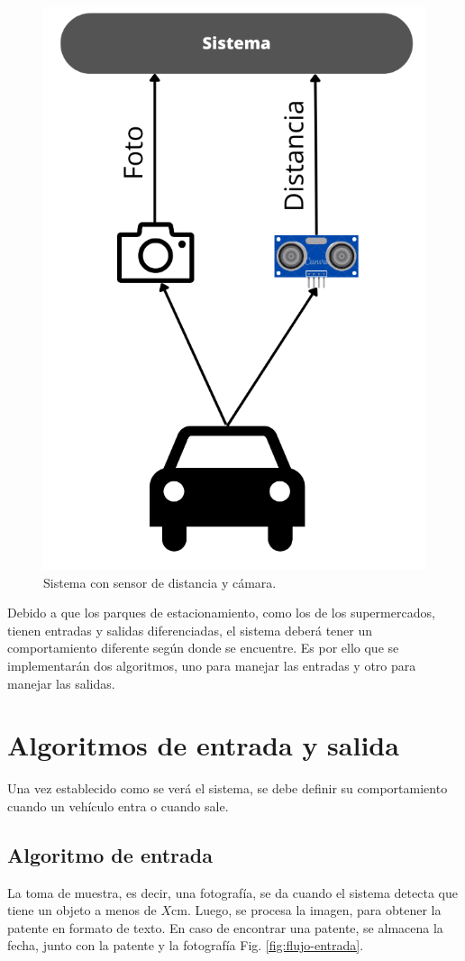 \begin{figure}
    \centering
    \includegraphics[width=.3\textwidth]{imgs/sistema-con-sensor.png}
    \caption{Sistema con sensor de distancia y cámara.}
    \label{fig:sistema-completa}
\end{figure}

Debido a que los parques de estacionamiento, como los de los supermercados, tienen entradas y salidas diferenciadas, el sistema deberá tener un comportamiento diferente según donde se encuentre.
Es por ello que se implementarán dos algoritmos, uno para manejar las entradas y otro para manejar las salidas.

\section{Algoritmos de entrada y salida}

Una vez establecido como se verá el sistema, se debe definir su comportamiento cuando un vehículo entra o cuando sale.

\subsection{Algoritmo de entrada}

La toma de muestra, es decir, una fotografía, se da cuando el sistema detecta que tiene un objeto a menos de $X$cm. Luego, se procesa la imagen, para obtener la patente en formato de texto.
En caso de encontrar una patente, se almacena la fecha, junto con la patente y la fotografía Fig. \ref{fig:flujo-entrada}.

